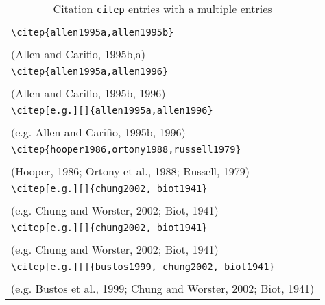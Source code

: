 \documentclass{article}
\begin{document}
\begin{table}
\begin{center}
\begin{tabular}{l}
	\verb#\citep{allen1995a,allen1995b}# \\
	\citep{allen1995a,allen1995b} \\
	(Allen and Carifio, 1995b,a) \\
\hline
	\verb#\citep{allen1995a,allen1996}# \\
	\citep{allen1995a,allen1996} \\
	(Allen and Carifio, 1995b, 1996) \\
\hline
	\verb#\citep[e.g.][]{allen1995a,allen1996}# \\
	\citep[e.g.][]{allen1995a,allen1996} \\
	(e.g. Allen and Carifio, 1995b, 1996) \\
\hline
	\verb#\citep{hooper1986,ortony1988,russell1979}# \\
	\citep{hooper1986,ortony1988,russell1979}  \\
	(Hooper, 1986; Ortony et al., 1988; Russell, 1979)\\
 \hline
	\verb#\citep[e.g.][]{chung2002, biot1941}#\\
	\citep[e.g.][]{chung2002, biot1941} \\
	(e.g. Chung and Worster, 2002; Biot, 1941)\\
 \hline
	\verb#\citep[e.g.][]{chung2002, biot1941}#\\
	\citep[e.g.][]{chung2002, biot1941} \\
	(e.g. Chung and Worster, 2002; Biot, 1941)\\
 \hline
	\verb#\citep[e.g.][]{bustos1999, chung2002, biot1941}#\\
	\citep[e.g.][]{bustos1999, chung2002, biot1941} \\
	(e.g. Bustos et al., 1999; Chung and Worster, 2002; Biot, 1941)\\
\end{tabular}
\end{center}
\caption{Citation \texttt{citep} entries with a multiple entries}
\end{table}
\end{document}
